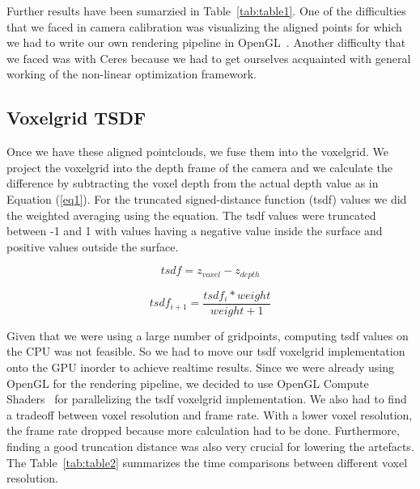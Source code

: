 \documentclass[10pt,twocolumn,letterpaper]{article}
\begin{document}
Further results have been sumarzied in Table~\ref{tab:table1}. One of the difficulties that we faced in camera calibration was visualizing the aligned points for which we had to write our own rendering pipeline in OpenGL~\cite{Authors3}. Another difficulty that we faced was with Ceres because we had to get ourselves acquainted with general working of the non-linear optimization framework. 
\subsection{Voxelgrid TSDF}
Once we have these aligned pointclouds, we fuse them into the voxelgrid. We project the voxelgrid into the depth frame of the camera and we calculate the difference by subtracting the voxel depth from the actual depth value as in Equation (\ref{eq1}). For the truncated signed-distance function (tsdf) values we did the weighted averaging using the equation. The tsdf values were truncated between -1 and 1 with values having a negative value inside the surface and positive values outside the surface.

\begin{equation}\label{eq1}
tsdf=z_{voxel} - z_{depth}
\end{equation}

\begin{equation}\label{eq2}
tsdf_{i+1}=\frac{tsdf_{i} * weight}{weight+1}
\end{equation}

Given that we were using a large number of gridpoints, computing tsdf values on the CPU was not feasible. So we had to move our tsdf voxelgrid implementation onto the GPU inorder to achieve realtime results. Since we were already using OpenGL for the rendering pipeline, we decided to use OpenGL Compute Shaders~\cite{Authors1} for parallelizing the tsdf voxelgrid implementation. We also had to find a tradeoff between voxel resolution and frame rate. With a lower voxel resolution, the frame rate dropped because more calculation had to be done. Furthermore, finding a good truncation distance was also very crucial for lowering the artefacts. The Table~\ref{tab:table2} summarizes the time comparisons between different voxel resolution.
\end{document}
